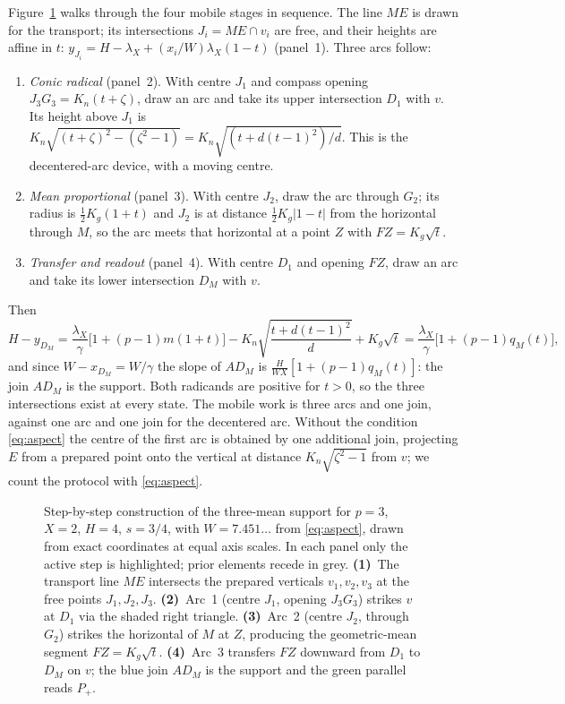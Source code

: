 Figure~\ref{fig:mean} walks through the four mobile stages in sequence. The line $ME$ is drawn for the
transport; its intersections $J_i=ME\cap v_i$ are free, and their heights are affine in $t$:
$y_{J_i}=H-\lambda_X+(x_i/W)\lambda_X(1-t)$ (panel~1). Three arcs follow:
\begin{enumerate}[label=\arabic*.]
\item \emph{Conic radical} (panel~2). With centre $J_1$ and compass opening $J_3G_3=K_n(t+\zeta)$, draw an
  arc and take its upper intersection $D_1$ with $v$. Its height above $J_1$ is
  $K_n\sqrt{(t+\zeta)^{2}-(\zeta^{2}-1)} = K_n\sqrt{(t+d(t-1)^{2})/d}$. This is the decentered-arc device,
  with a moving centre.
\item \emph{Mean proportional} (panel~3). With centre $J_2$, draw the arc through $G_2$; its radius is
  $\tfrac12K_g(1+t)$ and $J_2$ is at distance $\tfrac12K_g|1-t|$ from the horizontal through $M$, so the
  arc meets that horizontal at a point $Z$ with $FZ=K_g\sqrt t$.
\item \emph{Transfer and readout} (panel~4). With centre $D_1$ and opening $FZ$, draw an arc and take its
  lower intersection $D_M$ with $v$.
\end{enumerate}
Then
\[ H-y_{D_M}=\frac{\lambda_X}\gamma\bigl[1+(p-1)m(1+t)\bigr]-K_n\sqrt{\frac{t+d(t-1)^{2}}{d}}+K_g\sqrt t
=\frac{\lambda_X}\gamma\bigl[1+(p-1)q_M(t)\bigr], \]
and since $W-x_{D_M}=W/\gamma$ the slope of $AD_M$ is $\tfrac{H}{WX}[1+(p-1)q_M(t)]$: the join $AD_M$
is the support. Both radicands are positive for $t>0$, so the three intersections exist at every state.
The mobile work is three arcs and one join, against one arc and one join for the decentered arc. Without
the condition \eqref{eq:aspect} the centre of the first arc is obtained by one additional join, projecting
$E$ from a prepared point onto the vertical at distance $K_n\sqrt{\zeta^{2}-1}$ from $v$; we count the
protocol with \eqref{eq:aspect}.

\begin{figure}[htbp]
\centering\figMeanSteps
\caption{Step-by-step construction of the three-mean support for $p=3$, $X=2$, $H=4$, $s=3/4$, with
$W=7.451\ldots$ from \eqref{eq:aspect}, drawn from exact coordinates at equal axis scales. In each panel
only the active step is highlighted; prior elements recede in grey.
\textbf{(1)}~The transport line $ME$ intersects the prepared verticals $v_1,v_2,v_3$ at the free points
$J_1,J_2,J_3$.
\textbf{(2)}~Arc~1 (centre $J_1$, opening $J_3G_3$) strikes $v$ at $D_1$ via the shaded right triangle.
\textbf{(3)}~Arc~2 (centre $J_2$, through $G_2$) strikes the horizontal of $M$ at $Z$, producing the
geometric-mean segment $FZ=K_g\sqrt{t}$.
\textbf{(4)}~Arc~3 transfers $FZ$ downward from $D_1$ to $D_M$ on $v$; the blue join $AD_M$ is the support
and the green parallel reads $P_+$.}\label{fig:mean}
\end{figure}

